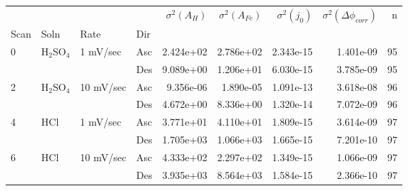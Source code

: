 \begin{tabular}{llllrrrrr}
\toprule
  &     &           &     &  $\sigma^2(A_H)$ &  $\sigma^2(A_{Fe})$ &  $\sigma^2(j_0)$ &  $\sigma^2(\Delta \phi_{corr})$ &   n \\
Scan & Soln & Rate & Dir &                  &                     &                  &                                 &     \\
\midrule
0 & H$_2$SO$_4$ & 1 mV/sec & Asc &        2.424e+02 &           2.786e+02 &        2.343e-15 &                       1.401e-09 &  95 \\
  &     &           & Des &        9.089e+00 &           1.206e+01 &        6.030e-15 &                       3.785e-09 &  95 \\
2 & H$_2$SO$_4$ & 10 mV/sec & Asc &        9.356e-06 &           1.890e-05 &        1.091e-13 &                       3.618e-08 &  96 \\
  &     &           & Des &        4.672e+00 &           8.336e+00 &        1.320e-14 &                       7.072e-09 &  96 \\
4 & HCl & 1 mV/sec & Asc &        3.771e+01 &           4.110e+01 &        1.809e-15 &                       3.614e-09 &  97 \\
  &     &           & Des &        1.705e+03 &           1.066e+03 &        1.665e-15 &                       7.201e-10 &  97 \\
6 & HCl & 10 mV/sec & Asc &        4.333e+02 &           2.297e+02 &        1.349e-15 &                       1.066e-09 &  97 \\
  &     &           & Des &        3.935e+03 &           8.564e+03 &        1.584e-15 &                       2.366e-10 &  97 \\
\bottomrule
\end{tabular}
